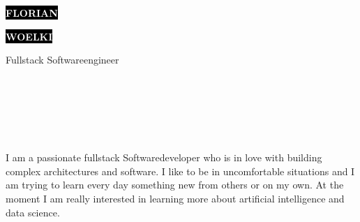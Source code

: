 \documentclass[9pt]{cvstyle}
\begin{document}
\begin{minipage}[t]{0.45\textwidth} 
	\vspace{-\baselineskip}
	
	\colorbox{black}{{\HUGE\textcolor{white}{\textbf{\MakeUppercase{Florian}}}}}
	
	\colorbox{black}{{\HUGE\textcolor{white}{\textbf{\MakeUppercase{Woelki}}}}}
	
	\vspace{6pt}
	
	{\huge Fullstack Softwareengineer}
\end{minipage}
\begin{minipage}[t]{0.275\textwidth}
	\vspace{-\baselineskip}
	
	\\
	\\	
\end{minipage}
\begin{minipage}[t]{0.275\textwidth}
	\vspace{-\baselineskip}
	
	\\
	\\
\end{minipage}

\vspace{0.5cm}


\begin{minipage}[t]{0.4\textwidth} 
	\vspace{-\baselineskip} 
	
	I am a passionate fullstack Softwaredeveloper who is in love with building complex
	architectures and software. I like to be in uncomfortable situations and I am trying
	to learn every day something new from others or on my own. At the moment I am really
	interested in learning more about artificial intelligence and data science.\\ 
\end{minipage}
\hfill 
\begin{minipage}[t]{0.5\textwidth} 
	\vspace{-\baselineskip} 
	\begin{barchart}{5.5}
	\end{barchart}
\end{minipage}
\end{document}
